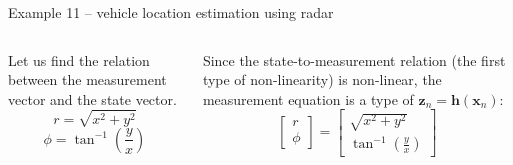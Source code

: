 \begin{frame}{Example 11 – vehicle location estimation using radar}
\begin{columns}
Let us find the relation between the measurement vector and the state vector. 
\[
r = \sqrt{x^2 + y^2}
\]
\[
\phi = \tan^{-1} \left( \frac{y}{x} \right)
\]

Since the state-to-measurement relation (the first type of non-linearity) is non-linear, the measurement equation is a type of \( \mathbf{z}_n = \mathbf{h}(\mathbf{x}_n) \):
\[
\begin{bmatrix}
r \\
\phi
\end{bmatrix}
=
\begin{bmatrix}
\sqrt{x^2 + y^2} \\
\tan^{-1} \left( \frac{y}{x} \right)
\end{bmatrix}
\]


\end{columns}
\end{frame}


